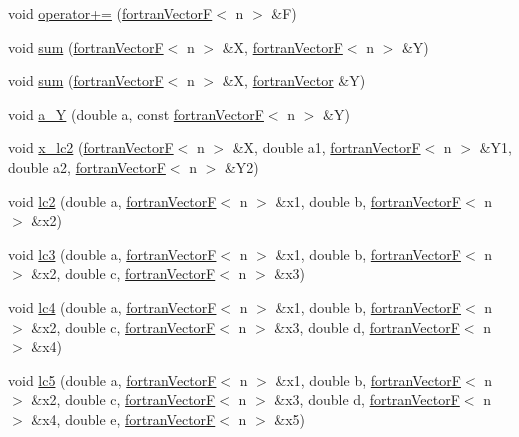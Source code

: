\begin{DoxyCompactItemize}
\item 
void \hyperlink{classodes_1_1fortranVectorF_a71be5e05948ac8584f53721a5923c4e3}{operator+=} (\hyperlink{classodes_1_1fortranVectorF}{fortran\-Vector\-F}$<$ n $>$ \&F)
\item 
void \hyperlink{classodes_1_1fortranVectorF_a26bf73ecfddcb1833ecd49d87455942e}{sum} (\hyperlink{classodes_1_1fortranVectorF}{fortran\-Vector\-F}$<$ n $>$ \&X, \hyperlink{classodes_1_1fortranVectorF}{fortran\-Vector\-F}$<$ n $>$ \&Y)
\item 
void \hyperlink{classodes_1_1fortranVectorF_a5efafdae76a0b8ac9db80430e3f08755}{sum} (\hyperlink{classodes_1_1fortranVectorF}{fortran\-Vector\-F}$<$ n $>$ \&X, \hyperlink{classodes_1_1fortranVector}{fortran\-Vector} \&Y)
\item 
void \hyperlink{classodes_1_1fortranVectorF_a4d0bef7a99cf98de9325074b26cbf0c9}{a\-\_\-\-Y} (double a, const \hyperlink{classodes_1_1fortranVectorF}{fortran\-Vector\-F}$<$ n $>$ \&Y)
\item 
void \hyperlink{classodes_1_1fortranVectorF_ac0070788755cc24441ee3076b2af4ec7}{x\-\_\-lc2} (\hyperlink{classodes_1_1fortranVectorF}{fortran\-Vector\-F}$<$ n $>$ \&X, double a1, \hyperlink{classodes_1_1fortranVectorF}{fortran\-Vector\-F}$<$ n $>$ \&Y1, double a2, \hyperlink{classodes_1_1fortranVectorF}{fortran\-Vector\-F}$<$ n $>$ \&Y2)
\item 
void \hyperlink{classodes_1_1fortranVectorF_a846832856478adfe05c207e0903d8984}{lc2} (double a, \hyperlink{classodes_1_1fortranVectorF}{fortran\-Vector\-F}$<$ n $>$ \&x1, double b, \hyperlink{classodes_1_1fortranVectorF}{fortran\-Vector\-F}$<$ n $>$ \&x2)
\item 
void \hyperlink{classodes_1_1fortranVectorF_a0a05d3cc41b7e0efa272f3bdb392590d}{lc3} (double a, \hyperlink{classodes_1_1fortranVectorF}{fortran\-Vector\-F}$<$ n $>$ \&x1, double b, \hyperlink{classodes_1_1fortranVectorF}{fortran\-Vector\-F}$<$ n $>$ \&x2, double c, \hyperlink{classodes_1_1fortranVectorF}{fortran\-Vector\-F}$<$ n $>$ \&x3)
\item 
void \hyperlink{classodes_1_1fortranVectorF_adef7bf6120c35cc4498e29e3ab3e2cb9}{lc4} (double a, \hyperlink{classodes_1_1fortranVectorF}{fortran\-Vector\-F}$<$ n $>$ \&x1, double b, \hyperlink{classodes_1_1fortranVectorF}{fortran\-Vector\-F}$<$ n $>$ \&x2, double c, \hyperlink{classodes_1_1fortranVectorF}{fortran\-Vector\-F}$<$ n $>$ \&x3, double d, \hyperlink{classodes_1_1fortranVectorF}{fortran\-Vector\-F}$<$ n $>$ \&x4)
\item 
void \hyperlink{classodes_1_1fortranVectorF_afff1eb41f54c2f84063c6a29fc8bd0f5}{lc5} (double a, \hyperlink{classodes_1_1fortranVectorF}{fortran\-Vector\-F}$<$ n $>$ \&x1, double b, \hyperlink{classodes_1_1fortranVectorF}{fortran\-Vector\-F}$<$ n $>$ \&x2, double c, \hyperlink{classodes_1_1fortranVectorF}{fortran\-Vector\-F}$<$ n $>$ \&x3, double d, \hyperlink{classodes_1_1fortranVectorF}{fortran\-Vector\-F}$<$ n $>$ \&x4, double e, \hyperlink{classodes_1_1fortranVectorF}{fortran\-Vector\-F}$<$ n $>$ \&x5)

\end{DoxyCompactItemize}
